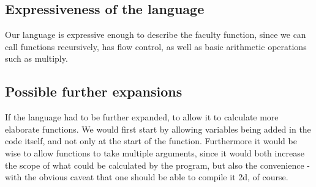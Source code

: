 \subsection{Expressiveness of the language}
Our language is expressive enough to describe the faculty function, since we can call functions recursively, has flow control, as well as basic arithmetic operations such as multiply. 


\subsection{Possible further expansions}
If the language had to be further expanded, to allow it to calculate more elaborate functions. We would first start by allowing variables being added in the code itself, and not only at the start of the function. Furthermore it would be wise to allow functions to take multiple arguments, since it would both increase the scope of what could be calculated by the program, but also the convenience - with the obvious caveat that one should be able to compile it 2d, of course.
